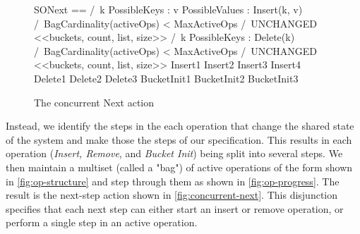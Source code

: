 \documentclass{uit-thesis}
\begin{document}
\begin{figure}
    \begin{tla}
SONext ==
    \/  /\ \E k \in PossibleKeys :
             \E v \in PossibleValues :
                Insert(k, v)
        /\ BagCardinality(activeOps) < MaxActiveOps
        /\ UNCHANGED <<buckets, count, list, size>>
    \/  /\ \E k \in PossibleKeys :
            Delete(k)
        /\ BagCardinality(activeOps) < MaxActiveOps
        /\ UNCHANGED <<buckets, count, list, size>>
    \/ Insert1
    \/ Insert2
    \/ Insert3
    \/ Insert4
    \/ Delete1
    \/ Delete2
    \/ Delete3
    \/ BucketInit1
    \/ BucketInit2
    \/ BucketInit3
    \end{tla}
\begin{tlatex}
%
%
%
%
%
%
%
%
%
%
%
%
%
%
%
%
%
%
\end{tlatex}
    \caption{The concurrent Next action}
    \label{fig:concurrent-next}
\end{figure}
Instead, we identify the steps in the each operation that change the shared state of the system and make those the steps of our specification. This results in each operation (\textit{Insert, Remove}, and \textit{Bucket Init}) being split into several steps. We then maintain a multiset (called a "bag") of active operations of the form shown in \autoref{fig:op-structure} and step through them as shown in \autoref{fig:op-progress}. The result is the next-step action shown in \autoref{fig:concurrent-next}. This disjunction specifies that each next step can either start an insert or remove operation, or perform a single step in an active operation.
\end{document}
